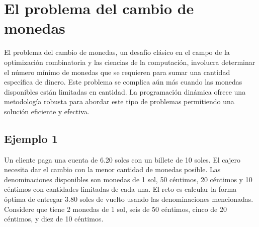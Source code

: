 
\section{El problema del cambio de monedas}
El problema del cambio de monedas, un desafío clásico en el campo de la optimización combinatoria y las ciencias de la computación, involucra determinar el número mínimo de monedas que se requieren para sumar una cantidad específica de dinero. Este problema se complica aún más cuando las monedas disponibles están limitadas en cantidad. La programación dinámica ofrece una metodología robusta para abordar este tipo de problemas permitiendo una solución eficiente y efectiva.

\subsection{Ejemplo 1}
Un cliente paga una cuenta de 6.20 soles con un billete de 10 soles. El cajero necesita dar el cambio con la menor cantidad de monedas posible. Las denominaciones disponibles son monedas de 1 sol, 50 céntimos, 20 céntimos y 10 céntimos con cantidades limitadas de cada una. El reto es calcular la forma óptima de entregar 3.80 soles de vuelto usando las denominaciones mencionadas. Considere que tiene 2 monedas de 1 sol, seis de 50 céntimos, cinco de 20 céntimos, y diez de 10 céntimos.

